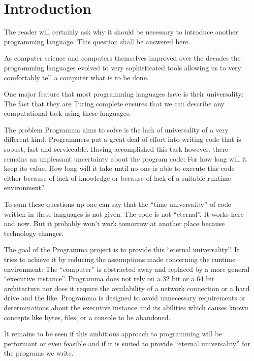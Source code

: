 \chapter{Introduction}

The reader will certainly ask why it should be necessary to introduce another programming
language. This question shall be answered here.

As computer science and computers themselves improved over the decades the
programming languages evolved to very sophisticated tools allowing us to very comfortably
tell a computer what is to be done.

One major feature that most programming languages have is their universality: The fact
that they are Turing complete ensures that we can describe any computational task using
these languages.

The problem Programma aims to solve is the lack of universality of a very different kind:
Programmers put a great deal of effort into writing code that is robust, fast and
serviceable. Having accomplished this task however, there remains an unpleasant
uncertainty about the program code: For how long will it keep its value. How long will it
take until no one is able to execute this code either because of lack of knowledge or
because of lack of a suitable runtime environment?

To sum these questions up one can say that the ``time universality'' of code written in these
languages is not given. The code is not ``eternal''. It works here and now. But it probably
won't work tomorrow at another place because technology changes.

The goal of the Programma project is to provide this ``eternal universality''. It tries to
achieve it by reducing the assumptions made concerning the runtime environment: The
``computer'' is abstracted away and replaced by a more general ``executive instance''.
Programma does not rely on a 32 bit or a 64 bit architecture nor does it require the
availability of a network connection or a hard drive and the like. Programma is designed to avoid
unnecessary requirements or determinations about the executive instance and its abilities
which causes known concepts like bytes, files, or a console to be abandoned.

It remains to be seen if this ambitious approach to programming will be performant or
even feasible and if it is suited to provide ``eternal universality'' for the programs we write.